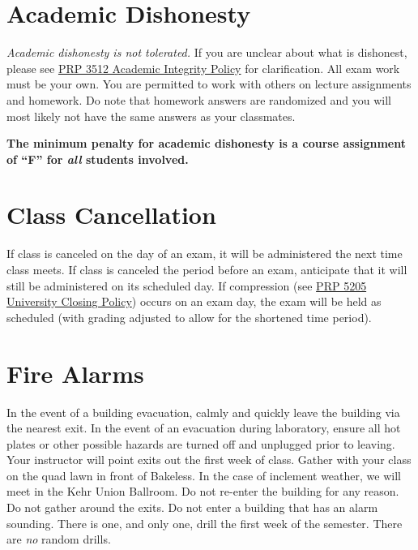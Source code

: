 \documentclass[11pt,letterpaper]{article}
\begin{document}
\section{Academic Dishonesty}
\emph{Academic dishonesty is not tolerated.} If you are unclear about what is
dishonest, please see 
\href{https://www.bloomu.edu/prp-3512-academic-integrity-policy}{PRP 3512
Academic Integrity Policy} for clarification. All exam work must be your own.
You are permitted to work with others on lecture assignments and homework. Do
note that homework answers are randomized and you will most likely not have the
same answers as your classmates.

\begin{mdframed}
	\centering\bfseries The minimum penalty for academic dishonesty is a
	course assignment of ``F'' for \emph{all} students involved.
\end{mdframed}

\section{Class Cancellation}
If class is canceled on the day of an exam, it will be administered the next
time class meets.  If class is canceled the period before an exam, anticipate
that it will still be administered on its scheduled day. If compression
(see \href{https://www.bloomu.edu/documents/prp5205}{PRP 5205 University Closing
Policy})
occurs on an exam day, the exam will be held as scheduled (with
grading adjusted to allow for the shortened time period).

\section{Fire Alarms}
In the event of a building evacuation, calmly and quickly leave the building via
the nearest exit. In the event of an evacuation during laboratory, ensure all
hot plates or other possible hazards are turned off and unplugged prior to
leaving. Your instructor will point exits out the first week of class.  Gather
with your class on the quad lawn in front of Bakeless. In the case of inclement
weather, we will meet in the Kehr Union Ballroom. Do not re-enter the
building for any reason. Do not gather around the exits. Do not enter a
building that has an alarm sounding. There is one, and only one, drill the first
week of the semester. There are \emph{no} random drills.

%
\end{document}

